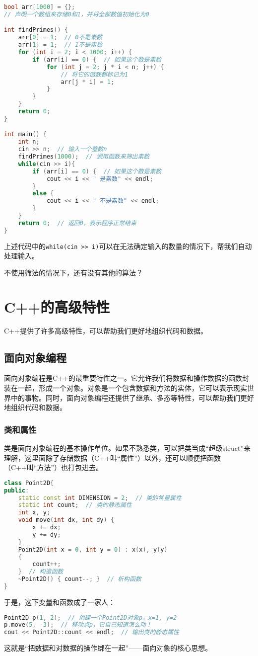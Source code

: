 \begin{answer}
\begin{lstlisting}[language=C++]
bool arr[1000] = {};
// 声明一个数组来存储0和1，并将全部数值初始化为0

int findPrimes() {
    arr[0] = 1;  // 0不是素数
    arr[1] = 1;  // 1不是素数
    for (int i = 2; i < 1000; i++) {
        if (arr[i] == 0) {  // 如果这个数是素数
            for (int j = 2; j * i < n; j++) {
                // 将它的倍数都标记为1
                arr[j * i] = 1;
            }
        }
    }
    return 0;
}

int main() {
    int n;
    cin >> n;  // 输入一个整数n
    findPrimes(1000);  // 调用函数来筛出素数
    while(cin >> i){
        if (arr[i] == 0) {  // 如果这个数是素数
            cout << i << " 是素数" << endl;
        }
        else {
            cout << i << " 不是素数" << endl;
        }
    }
    return 0;  // 返回0，表示程序正常结束
}
\end{lstlisting}
  上述代码中的\texttt{while(cin >> i)}可以在无法确定输入的数量的情况下，帮我们自动处理输入。
\end{answer}

\begin{exercise}
  不使用筛法的情况下，还有没有其他的算法？
\end{exercise}

\section{C++的高级特性}
C++提供了许多高级特性，可以帮助我们更好地组织代码和数据。

\subsection{面向对象编程}

面向对象编程是C++的最重要特性之一。它允许我们将数据和操作数据的函数封装在一起，形成一个对象。对象是一个包含数据和方法的实体，它可以表示现实世界中的事物。同时，面向对象编程还提供了继承、多态等特性，可以帮助我们更好地组织代码和数据。

\subsubsection{类和属性}

类是面向对象编程的基本操作单位。如果不熟悉类，可以把类当成“超级struct”来理解，这里面除了存储数据（C++叫“属性”）以外，还可以顺便把函数（C++叫“方法”）也打包进去。
\begin{lstlisting}[language=C++]
class Point2D{
public:
    static const int DIMENSION = 2;  // 类的常量属性
    static int count;  // 类的静态属性
    int x, y;
    void move(int dx, int dy) {
        x += dx;
        y += dy;
    }
    Point2D(int x = 0, int y = 0) : x(x), y(y)
    {
        count++;
    }  // 构造函数
    ~Point2D() { count--; }  // 析构函数
}
\end{lstlisting}
于是，这下变量和函数成了一家人：
\begin{lstlisting}[language=C++]
Point2D p(1, 2);  // 创建一个Point2D对象p，x=1, y=2
p.move(5, -3);  // 移动点p，它自己知道怎么动！
cout << Point2D::count << endl;  // 输出类的静态属性
\end{lstlisting}
这就是“把数据和对数据的操作绑在一起”——面向对象的核心思想。

